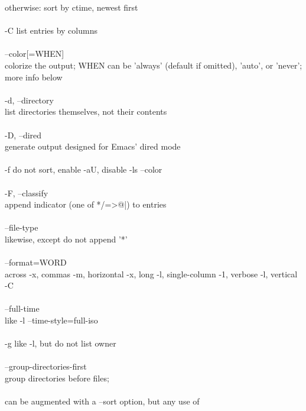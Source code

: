 \documentclass{article}
\begin{document}
              otherwise: sort by ctime, newest first \\
\\
\tabto{1cm}       -C     list entries by columns \\
\\
\tabto{1cm}       --color[=WHEN] \\
\tabto{2cm}              colorize  the output; WHEN can be 'always' (default if omitted),
              'auto', or 'never'; more info below \\
\\
\tabto{1cm}       -d, --directory \\
\tabto{2cm}              list directories themselves, not their contents \\
\\
\tabto{1cm}       -D, --dired \\
\tabto{2cm}              generate output designed for Emacs' dired mode \\
\\
\tabto{1cm}       -f     do not sort, enable -aU, disable -ls --color \\
\\
\tabto{1cm}       -F, --classify \\
\tabto{2cm}              append indicator (one of */=>@|) to entries \\
\\
\tabto{1cm}       --file-type \\
\tabto{2cm}              likewise, except do not append '*' \\
\\
\tabto{1cm}       --format=WORD \\
\tabto{2cm}              across -x, commas -m, horizontal -x, long -l, single-column  -1,
              verbose -l, vertical -C \\
\\
\tabto{1cm}       --full-time \\
\tabto{2cm}              like -l --time-style=full-iso \\
\\
\tabto{1cm}       -g     like -l, but do not list owner \\
\\
\tabto{1cm}       --group-directories-first \\
\tabto{2cm}              group directories before files; \\
\\
\tabto{2cm}              can   be  augmented  with  a  --sort  option,  but  any  use  of
\end{document}
